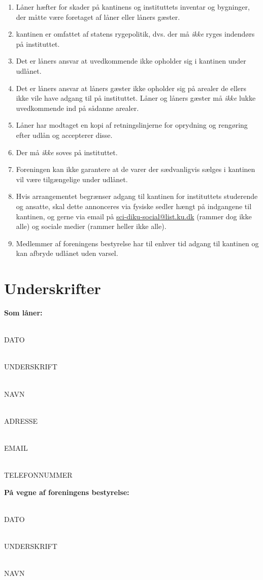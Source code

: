 \documentclass[a4paper]{article}
\begin{document}
\begin{enumerate}
\item Låner hæfter for skader på kantinens og instituttets inventar og
bygninger, der måtte være foretaget af låner eller låners gæster.
\item kantinen er omfattet af statens rygepolitik, dvs. der må \emph{ikke} ryges
indendørs på instituttet.
\item Det er låners ansvar at uvedkommende ikke opholder sig i kantinen under
udlånet.
\item Det er låners ansvar at låners gæster ikke opholder sig på arealer de
ellers ikke vile have adgang til på instituttet.  Låner og låners gæster må
\emph{ikke} lukke uvedkommende ind på sådanne arealer.
\item Låner har modtaget en kopi af retningslinjerne for oprydning og rengøring
efter udlån og accepterer disse.
\item Der må \emph{ikke} soves på instituttet.
\item Foreningen kan ikke garantere at de varer der sædvanligvis sælges i
kantinen vil være tilgængelige under udlånet.
\item Hvis arrangementet begrænser adgang til kantinen for instituttets
studerende og ansatte, skal dette annonceres via fysiske sedler hængt på
indgangene til kantinen, og gerne via email på \url{sci-diku-social@list.ku.dk}
(rammer dog ikke alle) og sociale medier (rammer heller ikke alle).
\item Medlemmer af foreningens bestyrelse har til enhver tid adgang til
kantinen og kan afbryde udlånet uden varsel.
\end{enumerate}

\section{Underskrifter}


\begin{multicols}{2}
\textbf{Som låner:}

\newcommand{\skrivher}[1]{\underline{\hspace{7.5cm}}\\[-1mm]{\scriptsize #1}}

\skrivher{DATO}

\skrivher{UNDERSKRIFT}

\skrivher{NAVN}

\skrivher{ADRESSE}

\skrivher{EMAIL}

\skrivher{TELEFONNUMMER}

\columnbreak

\textbf{På vegne af foreningens bestyrelse:}

\skrivher{DATO}

\skrivher{UNDERSKRIFT}

\skrivher{NAVN}

\end{multicols}
\end{document}
